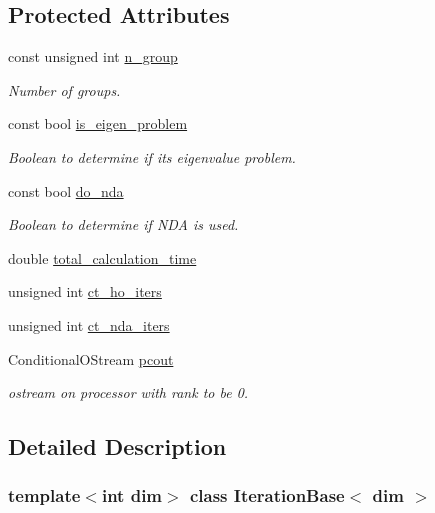 \subsection*{Protected Attributes}
\begin{DoxyCompactItemize}
\item 
const unsigned int \hyperlink{class_iteration_base_a0c3ec88894828b2bbe3a5ab4fca927ae}{n\+\_\+group}
\begin{DoxyCompactList}\small\item\em Number of groups. \end{DoxyCompactList}\item 
const bool \hyperlink{class_iteration_base_af630d420379811fe33e19c1c8691ad7c}{is\+\_\+eigen\+\_\+problem}
\begin{DoxyCompactList}\small\item\em Boolean to determine if it\textquotesingle{}s eigenvalue problem. \end{DoxyCompactList}\item 
const bool \hyperlink{class_iteration_base_a871d082ca148eb7976f591f99c2ce81b}{do\+\_\+nda}
\begin{DoxyCompactList}\small\item\em Boolean to determine if N\+DA is used. \end{DoxyCompactList}\item 
double \hyperlink{class_iteration_base_a98cf351c6b85b6bbdc68c914ecdaaf1e}{total\+\_\+calculation\+\_\+time}
\item 
unsigned int \hyperlink{class_iteration_base_afd007145fe5b7bfe22012c44c20d31a4}{ct\+\_\+ho\+\_\+iters}
\item 
unsigned int \hyperlink{class_iteration_base_a1b4bda01b55383e80b0631fbfc339385}{ct\+\_\+nda\+\_\+iters}
\item 
Conditional\+O\+Stream \hyperlink{class_iteration_base_ab057491553962560cfad06f19fb00ff5}{pcout}
\begin{DoxyCompactList}\small\item\em ostream on processor with rank to be 0. \end{DoxyCompactList}\end{DoxyCompactItemize}


\subsection{Detailed Description}
\subsubsection*{template$<$int dim$>$\newline
class Iteration\+Base$<$ dim $>$}

